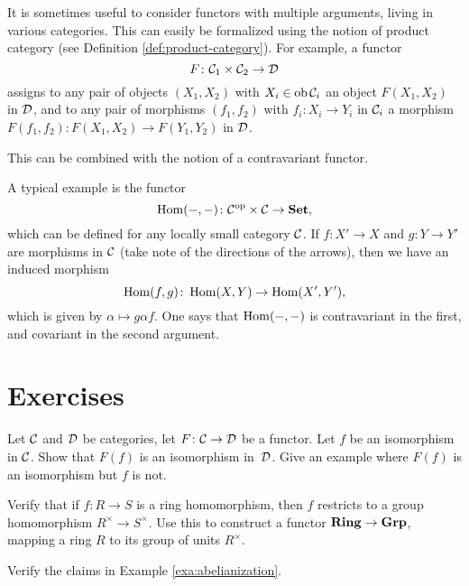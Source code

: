 It is sometimes useful to consider functors with multiple arguments, living in various categories. This can easily be formalized using the notion of product category (see Definition \ref{def:product-category}). For example, a functor
\[
	F\colon {\mathcal{C}}_1 \times {\mathcal{C}}_2 \to {\mathcal{D}}
\]
assigns to any pair of objects $(X_1,X_2)$ with $X_i\in \operatorname{ob} {\mathcal{C}}_i$ an object $F(X_1,X_2)$ in ${\mathcal{D}}$, and to any pair of morphisms $(f_1,f_2)$ with $f_i\colon X_i\to Y_i$ in ${\mathcal{C}}_i$ a morphism $F(f_1,f_2) \colon F(X_1,X_2) \to F(Y_1,Y_2)$ in ${\mathcal{D}}$. 

This can be combined with the notion of a contravariant functor. 

\begin{example}\label{exa:hom-in-two-arguments}
A typical example is the functor
\[
	\operatorname{Hom}(-,-) \colon {\mathcal{C}}^{\mathrm{op}} \times {\mathcal{C}} \to \mathbf{Set},
\]
which can be defined for any locally small category ${\mathcal{C}}$. If $f\colon X'\to X$ and $g\colon Y\to Y'$ are morphisms in ${\mathcal{C}}$ (take note of the directions of the arrows), then we have an induced morphism
\[	
	\operatorname{Hom}(f,g)\colon \operatorname{Hom}(X,Y) \to \operatorname{Hom}(X',Y'),
\]
which is given by $\alpha \mapsto g\alpha f$. One says that $\operatorname{Hom}(-,-)$ is contravariant in the first, and covariant in the second argument.
\end{example}





\newpage
\section*{Exercises}



\begin{exercise}
Let ${\mathcal{C}}$ and ${\mathcal{D}}$ be categories, let $F\colon {\mathcal{C}} \to {\mathcal{D}}$ be a functor. Let $f$ be an isomorphism in ${\mathcal{C}}$. Show that $F(f)$ is an isomorphism
in~${\mathcal{D}}$.  Give an example where $F(f)$ is an isomorphism but $f$ is not.
\end{exercise}

\begin{exercise}
Verify that if $f\colon R\to S$ is a ring homomorphism, then $f$ restricts to a group homomorphism $R^\times \to S^\times$. Use this to construct a functor $\mathbf{Ring} \to \mathbf{Grp}$, mapping a ring $R$ to its group of units $R^\times$.
\end{exercise}


\begin{exercise}Verify the claims in Example \ref{exa:abelianization}.
\end{exercise}

